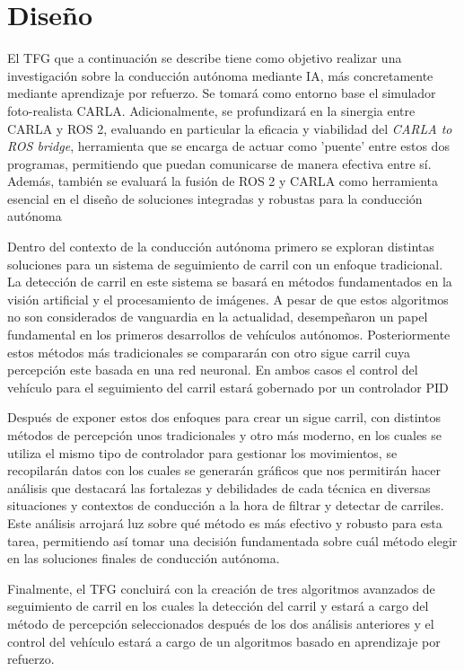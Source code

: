 \chapter{Diseño}
\label{cap:capitulo4}

El \ac{TFG} que a continuación se describe tiene como objetivo realizar una investigación sobre la conducción autónoma mediante \ac{IA}, más concretamente mediante aprendizaje por refuerzo. Se tomará como entorno base el simulador foto-realista CARLA. Adicionalmente, se profundizará en la sinergia entre CARLA y ROS 2, evaluando en particular la eficacia y viabilidad del \textit{CARLA to ROS bridge}, herramienta que se encarga de actuar como 'puente' entre estos dos programas, permitiendo que puedan comunicarse de manera efectiva entre sí. Además, también se evaluará la fusión de ROS  2 y CARLA como herramienta esencial en el diseño de soluciones integradas y robustas para la conducción autónoma

\bigskip

Dentro del contexto de la conducción autónoma primero se exploran distintas soluciones para un sistema de seguimiento de carril con un enfoque tradicional. La detección de carril en este sistema se basará en métodos fundamentados en la visión artificial y el procesamiento de imágenes. A pesar de que estos algoritmos no son considerados de vanguardia en la actualidad, desempeñaron un papel fundamental en los primeros desarrollos de vehículos autónomos. Posteriormente estos métodos más tradicionales se compararán con otro sigue carril cuya percepción este basada en una red neuronal. En ambos casos el control del vehículo para el seguimiento del carril estará gobernado por un controlador \ac{PID}
\bigskip

Después de exponer estos dos enfoques para crear un sigue carril, con distintos métodos de percepción unos tradicionales y otro más moderno, en los cuales se utiliza el mismo tipo de controlador para gestionar los movimientos, se recopilarán datos con los cuales se generarán gráficos que nos permitirán hacer análisis que destacará las fortalezas y debilidades de cada técnica en diversas situaciones y contextos de conducción a la hora de filtrar y detectar de carriles. Este análisis arrojará luz sobre qué método es más efectivo y robusto para esta tarea, permitiendo así tomar una decisión fundamentada sobre cuál método elegir en las soluciones finales de conducción autónoma.

\bigskip

Finalmente, el \ac{TFG} concluirá con la creación de tres algoritmos avanzados de seguimiento de carril en los cuales la detección del carril y estará a cargo del método de percepción seleccionados después de los dos análisis anteriores y el control del vehículo estará a cargo de un algoritmos basado en aprendizaje por refuerzo.

